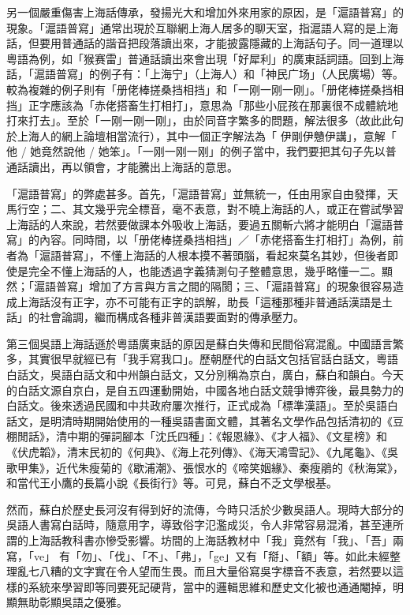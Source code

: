 \documentclass[a5paper, 10pt, openany]{book} %
\begin{document}
另一個嚴重傷害上海話傳承，發揚光大和增加外來用家的原因，是「滬語普寫」的現象。「滬語普寫」通常出現於互聯網上海人居多的聊天室，指滬語人寫的是上海話，但要用普通話的諧音把段落讀出來，才能披露隱藏的上海話句子。同一道理以粵語為例，如「猴赛雷」普通話讀出來會出現「好犀利」的廣東話詞語。回到上海話，「滬語普寫」的例子有：「上海宁」（上海人）和「神民广场」（人民廣場）等。較為複雜的例子則有「册佬棒搓桑挡相挡」和「一刚一刚一刚」。「册佬棒搓桑挡相挡」正字應該為「赤佬搭畜生打相打」，意思為「那些小屁孩在那裏很不成體統地打來打去」。至於「一刚一刚一刚」，由於同音字繁多的問題，解法很多（故此此句於上海人的網上論壇相當流行），其中一個正字解法為「 伊剛伊戇伊講」，意解「 他 / 她竟然說他 / 她笨」。「一刚一刚一刚」的例子當中，我們要把其句子先以普通話讀出，再以領會，才能騰出上海話的意思。

「滬語普寫」的弊處甚多。首先，「滬語普寫」並無統一，任由用家自由發揮，天馬行空；二、其文幾乎完全標音，毫不表意，對不曉上海話的人，或正在嘗試學習上海話的人來說，若然要做課本外吸收上海話，要過五關斬六將才能明白「滬語普寫」的內容。同時間，以「册佬棒搓桑挡相挡」／「赤佬搭畜生打相打」為例，前者為「滬語普寫」，不懂上海話的人根本摸不著頭腦，看起來莫名其妙，但後者即使是完全不懂上海話的人，也能透過字義猜測句子整體意思，幾乎略懂一二。顯然；「滬語普寫」增加了方言與方言之間的隔閡；三、「滬語普寫」的現象很容易造成上海話沒有正字，亦不可能有正字的誤解，助長「這種那種非普通話漢語是土話」的社會論調，繼而構成各種非普漢語要面對的傳承壓力。

第三個吳語上海話遜於粵語廣東話的原因是蘇白失傳和民間俗寫混亂。中國語言繁多，其實很早就經已有「我手寫我口」。歷朝歷代的白話文包括官話白話文，粵語白話文，吳語白話文和中州韻白話文，又分別稱為京白，廣白，蘇白和韻白。今天的白話文源自京白，是自五四運動開始，中國各地白話文競爭博弈後，最具勢力的白話文。後來透過民國和中共政府屢次推行，正式成為「標準漢語」。至於吳語白話文，是明清時期開始使用的一種吳語書面文體，其著名文學作品包括清初的《豆棚閒話》，清中期的彈詞腳本「沈氏四種」：《報恩緣》、《才人福》、《文星榜》和《伏虎韜》，清末民初的《何典》、《海上花列傳》、《海天鴻雪記》、《九尾龜》、《吳歌甲集》，近代朱瘦菊的《歇浦潮》、張恨水的《啼笑姻緣》、秦瘦鵑的《秋海棠》，和當代王小鷹的長篇小說《長街行》等。可見，蘇白不乏文學根基。

然而，蘇白於歷史長河沒有得到好的流傳，今時只活於少數吳語人。現時大部分的吳語人書寫白話時，隨意用字，導致俗字氾濫成災，令人非常容易混淆，甚至連所謂的上海話教科書亦慘受影響。坊間的上海話教材中「我」竟然有「我」、「吾」兩寫，「ve」 有「勿」、「伐」、「不」、「弗」，「ge」又有「搿」、「額」等。如此未經整理亂七八糟的文字實在令人望而生畏。而且大量俗寫吳字標音不表意，若然要以這樣的系統來學習即等同要死記硬背，當中的邏輯思維和歷史文化被也通通閹掉，明顯無助彰顯吳語之優雅。
\end{document}
